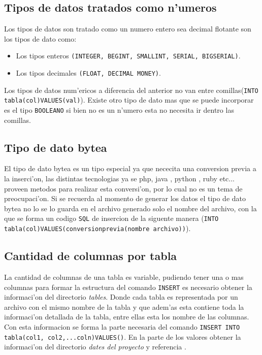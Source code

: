 \subsection{Tipos de datos tratados como n'umeros}
Los tipos de datos son tratado como un numero entero sea decimal flotante son los tipos de dato como:
\begin{itemize}
\item Los tipos enteros \texttt{(INTEGER, BEGINT, SMALLINT, SERIAL, BIGSERIAL)}.
\item Los tipos decimales \texttt{(FLOAT, DECIMAL MONEY)}.
\end{itemize}
Los tipos de datos num'ericos a diferencia del anterior no van entre comillas(\texttt{INTO tabla(col)VALUES(val)}).
Existe otro tipo de dato mas que se puede incorporar es el tipo \texttt{BOOLEANO} si bien no es un n'umero esta no necesita ir dentro las comillas.
\subsection{Tipo de dato bytea}
El tipo de dato bytea es un tipo especial ya que nececita una conversion previa a la inserci'on, las distintas tecnologias ya se php, java , python , ruby etc... proveen metodos para realizar esta conversi'on, por lo cual no es un tema de preocupaci'on. Si se recuerda al momento de generar los datos el tipo de dato bytea no lo se lo guarda en el archivo generado solo el nombre del archivo, con la que se forma un codigo \texttt{SQL} de insercion de la siguente manera (\texttt{INTO tabla(col)VALUES(conversionprevia(nombre archivo))}).
\subsection{Cantidad de columnas por tabla}
La cantidad de columnas de una tabla es variable, pudiendo tener una o mas columnas para formar la estructura del comando \texttt{INSERT} es necesario obtener la informaci'on del directorio \textit{tables}. Donde cada tabla es representada por un archivo con el mismo nombre de la tabla y que adem'as esta contiene toda la informaci'on detallada de la tabla, entre ellas esta los nombre de las columnas.
Con esta informacion se forma la parte necesaria del comando \texttt{INSERT INTO tabla(col1, col2,...coln)VALUES()}.
En la parte de los valores obtener la informaci'on del directorio \textit{dates del proyecto} y referencia \cite{emifpgsql}.

     